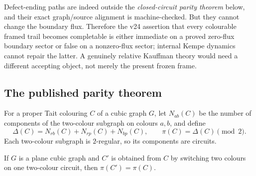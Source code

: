 Defect-ending paths are indeed outside the \emph{closed-circuit parity
theorem} below, and their exact graph/source alignment is machine-checked.
But they cannot change the boundary flux.  Therefore the v24 assertion that
every colourable framed trail becomes completable is either immediate on a
proved zero-flux boundary sector or false on a nonzero-flux sector; internal
Kempe dynamics cannot repair the latter.  A genuinely relative Kauffman
theory would need a different accepting object, not merely the present frozen
frame.

\subsection{The published parity theorem}

For a proper Tait colouring $C$ of a cubic graph $G$, let
$N_{ab}(C)$ be the number of components of the two-colour subgraph on
colours $a,b$, and define
\[
  \Delta(C)=N_{rb}(C)+N_{rp}(C)+N_{bp}(C),
  \qquad \pi(C)=\Delta(C)\pmod 2.
\]
Each two-colour subgraph is $2$-regular, so its components are circuits.

\begin{theorem}
\label{thm:kauffman-parity}
\Sprose
If $G$ is a plane cubic graph and $C'$ is obtained from $C$ by
switching two colours on one two-colour circuit, then
$\pi(C')=\pi(C)$.
\end{theorem}

